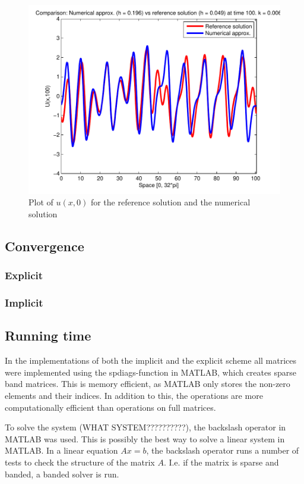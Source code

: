 \begin{figure}[H]
\centering
\includegraphics[scale=0.55]
{../PDFs/IMEX/comp_num_ref_t100.pdf}
\caption{Plot of $u(x,0)$ for the reference solution and the numerical solution}
\label{fig:errTime}
\end{figure}

\subsection{Convergence}
\subsubsection{Explicit}
\subsubsection{Implicit}

\subsection{Running time}
In the implementations of both the implicit and the explicit scheme all matrices were implemented using the spdiags-function in MATLAB, which creates sparse band matrices. This is memory efficient, as MATLAB only stores the non-zero elements and their indices. In addition to this, the operations are more computationally efficient than operations on full matrices. \cite{sparse}

To solve the system (WHAT SYSTEM??????????), the backslash operator in MATLAB was used. This is possibly the best way to solve a linear system in MATLAB.  In a linear equation $Ax = b$, the backslash operator runs a number of tests to check the structure of the matrix $A$. I.e. if the matrix is sparse and banded, a banded solver is run.

